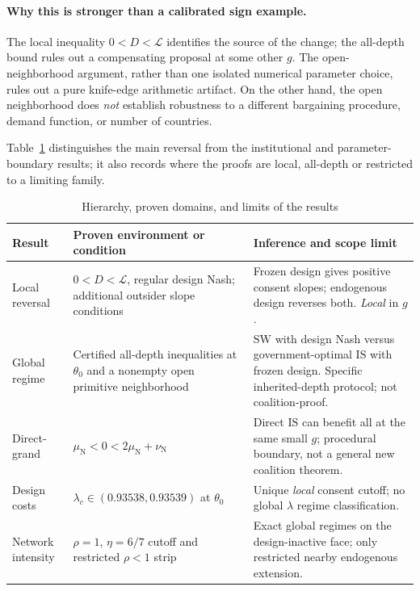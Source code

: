 \documentclass[11pt,a4paper]{article}
\theoremstyle{remark}\newtheorem{remark}[theorem]{Remark}
\newcommand{\SW}{\mathrm{SW}}\newcommand{\SU}{\mathrm{SU}}\newcommand{\IS}{\mathrm{IS}}
\newcommand{\N}{\mathrm{N}}\newcommand{\F}{\mathrm{F}}
\newcommand{\loss}{\mathcal L}\newcommand{\vect}[1]{\boldsymbol{#1}}
\begin{document}
\paragraph{Why this is stronger than a calibrated sign example.}
The local inequality $0<D<\loss$ identifies the source of the change; the all-depth bound rules out a compensating proposal at some other $g$. The open-neighborhood argument, rather than one isolated numerical parameter choice, rules out a pure knife-edge arithmetic artifact. On the other hand, the open neighborhood does \emph{not} establish robustness to a different bargaining procedure, demand function, or number of countries.

Table~\ref{tab:map} distinguishes the main reversal from the institutional and parameter-boundary results; it also records where the proofs are local, all-depth or restricted to a limiting family.


\begin{table}[tbp]
\centering\footnotesize
\caption{Hierarchy, proven domains, and limits of the results}\label{tab:map}
\renewcommand{\arraystretch}{1.22}
\begin{tabularx}{\linewidth}{@{}>{\raggedright\arraybackslash}p{.18\linewidth}>{\raggedright\arraybackslash}p{.34\linewidth}>{\raggedright\arraybackslash}X@{}}
\toprule
Result & Proven environment or condition & Inference and scope limit \\
\midrule
Local reversal & $0<D<\mathcal L$, regular design Nash; additional outsider slope conditions & Frozen design gives positive consent slopes; endogenous design reverses both. \emph{Local} in $g$. \\
Global regime & Certified all-depth inequalities at $\theta_0$ and a nonempty open primitive neighborhood & $\SW$ with design Nash versus government-optimal $\IS$ with frozen design. Specific inherited-depth protocol; not coalition-proof. \\
Direct-grand & $\mu_{\N}<0<2\mu_{\N}+\nu_{\N}$ & Direct $\IS$ can benefit all at the same small $g$; procedural boundary, not a general new coalition theorem. \\
Design costs & $\lambda_c\in(0.93538,0.93539)$ at $\theta_0$ & Unique \emph{local} consent cutoff; no global $\lambda$ regime classification. \\
Network intensity & $\rho=1$, $\eta=6/7$ cutoff and restricted $\rho<1$ strip & Exact global regimes on the design-inactive face; only restricted nearby endogenous extension. \\
\bottomrule
\end{tabularx}
\end{table}
\end{document}
